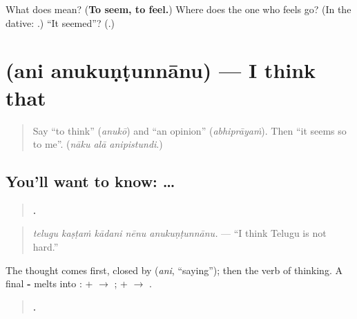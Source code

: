 \begin{tcolorbox}[breakable,colback=teal!4,colframe=teal!35!black,title={Before you move on}]
What does \textbf{} mean? (\textbf{To seem, to feel.}) Where does the one who feels go? (In the dative: \textbf{}.) \textquotedblleft{}It seemed\textquotedblright{}? (\textbf{}.)
\end{tcolorbox}
\section[\texorpdfstring{\te{అని} \te{అనుకుంటున్నాను} (ani anukuṇṭunnānu)}{అని అనుకుంటున్నాను (ani anukuṇṭunnānu)}]{  (ani anukuṇṭunnānu) — I think that}

\label{lesson:TE-C318-anukuntunnanu}



\begin{quote}
Say \textquotedblleft{}to think\textquotedblright{} (\emph{anukō}) and \textquotedblleft{}an opinion\textquotedblright{} (\emph{abhiprāyaṁ}). Then \textquotedblleft{}it seems so to me\textquotedblright{}. (\emph{nāku alā anipistundi}.)
\end{quote}

\subsection*{You'll want to know: …  }
\begin{quote}
\textbf{    .}
\end{quote}

\begin{quote}
\emph{telugu kaṣṭaṁ kādani nēnu anukuṇṭunnānu.} — \textquotedblleft{}I think Telugu is not hard.\textquotedblright{}
\end{quote}

The thought comes first, closed by \textbf{} (\emph{ani}, \textquotedblleft{}saying\textquotedblright{}); then the verb of thinking. A final \textbf{-} melts into \textbf{}: \textbf{} + \textbf{} $\to$ \textbf{}; \textbf{} + \textbf{} $\to$ \textbf{}.

\begin{quote}
\textbf{    .}
\end{quote}


